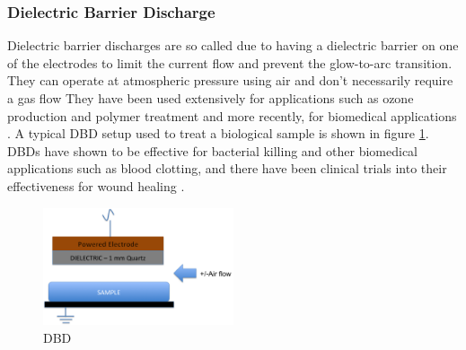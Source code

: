\documentclass[11pt, oneside]{article}   	%
\newcommand{\todo}[1]{ \textcolor{red}{\bf{To Do:} #1}}
\begin{document}
\subsubsection{Dielectric Barrier Discharge}
Dielectric barrier discharges are so called due to having a dielectric barrier on one of the electrodes to limit the current flow and prevent the glow-to-arc transition. 
They can operate at atmospheric pressure using air and don't necessarily require a gas flow \cite{Fridman2013plasmamedicine}
They have been used extensively for applications such as ozone production and polymer treatment and more recently, for biomedical applications \cite{Fridman2013plasmamedicine, Brehmer2015alleviation}.
A typical DBD setup used to treat a biological sample is shown in figure \ref{fig:DBD}.
DBDs have shown to be effective for bacterial killing and other biomedical applications such as blood clotting, and there have been clinical trials into their effectiveness for wound healing \cite{Daeschlein2012in, Fridman2006blood, Brehmer2015alleviation}. 







\begin{figure}
\centering
\includegraphics[width=0.5\textwidth]{Figures/DBD}
\caption{DBD}
\label{fig:DBD}
\end{figure}

\end{document}

